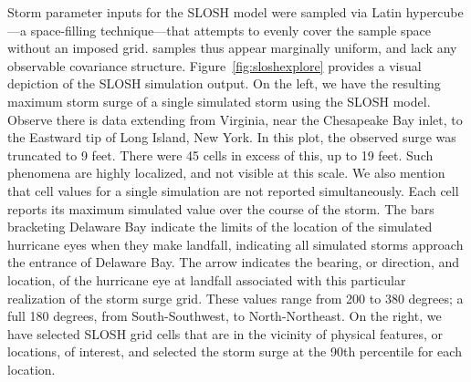 Storm parameter inputs for the SLOSH model were sampled via Latin hypercube---a space-filling
    technique---that attempts to evenly cover the sample space without an imposed grid.
    samples thus appear marginally uniform, and lack any observable covariance structure.
    Figure~\ref{fig:sloshexplore} provides a visual depiction of the SLOSH simulation 
    output. On the left, we have the resulting maximum storm surge of a single
    simulated storm using the SLOSH model.  Observe there is data extending from
    Virginia, near the Chesapeake Bay inlet, to the Eastward tip of Long Island, New York.  
    In this plot, the observed  
    surge was truncated to 9 feet.  There were 45 cells in excess of this, up to 19 feet.
    Such phenomena are highly localized, and not visible at this scale.  We also mention
    that cell values for a single simulation are not reported simultaneously.  Each cell 
    reports its maximum simulated value over the course of the storm.
    The bars bracketing Delaware Bay indicate the limits of the location of the simulated
    hurricane eyes when they make landfall, indicating all simulated storms approach the
    entrance of Delaware Bay. The arrow indicates the bearing, or direction, and location, 
    of the hurricane eye at landfall associated with this particular realization of the 
    storm surge grid.  These values range from 200 to 380 degrees; a full 180 degrees, from
    South-Southwest, to North-Northeast.  On the right, we have selected SLOSH grid cells 
    that are in the vicinity of physical features, or locations, of interest, and selected 
    the storm surge at the 90th percentile for each location.

